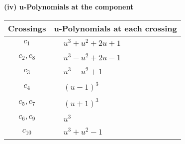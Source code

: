 \documentclass[1p]{elsarticle_modified}
\theoremstyle{definition}
\begin{document}
\newpage\renewcommand{\arraystretch}{1}
\flushleft \textbf{(iv) u-Polynomials at the component}\newline \\
\begin{tabular}{m{50pt}|m{274pt}}
Crossings & \hspace{64pt}u-Polynomials at each crossing \\
\hline $$\begin{aligned}c_{1}\end{aligned}$$&$\begin{aligned}
&u^3+u^2+2 u+1
\end{aligned}$\\
\hline $$\begin{aligned}c_{2},c_{8}\end{aligned}$$&$\begin{aligned}
&u^3- u^2+2 u-1
\end{aligned}$\\
\hline $$\begin{aligned}c_{3}\end{aligned}$$&$\begin{aligned}
&u^3- u^2+1
\end{aligned}$\\
\hline $$\begin{aligned}c_{4}\end{aligned}$$&$\begin{aligned}
&(u-1)^3
\end{aligned}$\\
\hline $$\begin{aligned}c_{5},c_{7}\end{aligned}$$&$\begin{aligned}
&(u+1)^3
\end{aligned}$\\
\hline $$\begin{aligned}c_{6},c_{9}\end{aligned}$$&$\begin{aligned}
&u^3
\end{aligned}$\\
\hline $$\begin{aligned}c_{10}\end{aligned}$$&$\begin{aligned}
&u^3+u^2-1
\end{aligned}$\\
\hline
\end{tabular}\\~\\
\newpage\renewcommand{\arraystretch}{1}
\end{document}

